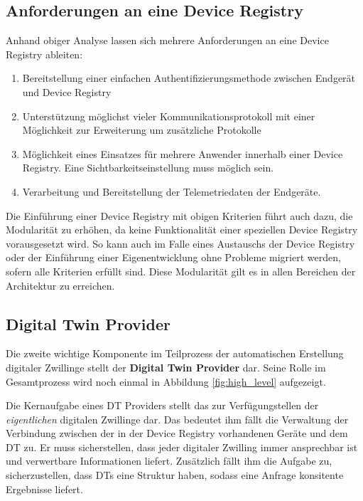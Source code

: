 \subsection*{Anforderungen an eine Device Registry}

Anhand obiger Analyse lassen sich mehrere Anforderungen an eine Device Registry ableiten:

\begin{enumerate}
    \item Bereitstellung einer einfachen Authentifizierungsmethode zwischen Endgerät und Device Registry
    \item Unterstützung möglichst vieler Kommunikationsprotokoll mit einer Möglichkeit zur Erweiterung um zusätzliche Protokolle
    \item Möglichkeit eines Einsatzes für mehrere Anwender innerhalb einer Device Registry. Eine Sichtbarkeitseinstellung muss möglich sein.
    \item Verarbeitung und Bereitstellung der Telemetriedaten der Endgeräte.
\end{enumerate}

Die Einführung einer Device Registry mit obigen Kriterien führt auch dazu, die Modularität zu erhöhen, da keine Funktionalität einer speziellen Device Registry vorausgesetzt wird. So kann auch im Falle eines Austauschs der Device Registry oder der Einführung einer Eigenentwicklung ohne Probleme migriert werden, sofern alle Kriterien erfüllt sind. Diese Modularität gilt es in allen Bereichen der Architektur zu erreichen.

\subsection{Digital Twin Provider}
\label{sec:dtp}

Die zweite wichtige Komponente im Teilprozess der automatischen Erstellung digitaler Zwillinge stellt der \textbf{Digital Twin Provider} dar. Seine Rolle im Gesamtprozess wird noch einmal in Abbildung \vref{fig:high_level} aufgezeigt.

Die Kernaufgabe eines \ac{DT} Providers stellt das zur Verfügungstellen der \textit{eigentlichen} digitalen Zwillinge dar. Das bedeutet ihm fällt die Verwaltung der Verbindung zwischen der in der Device Registry vorhandenen Geräte und dem \ac{DT} zu. Er muss sicherstellen, dass jeder digitaler Zwilling immer ansprechbar ist und verwertbare Informationen liefert. Zusätzlich fällt ihm die Aufgabe zu, sicherzustellen, dass \ac{DT}s eine Struktur haben, sodass eine Anfrage konsitente Ergebnisse liefert.

